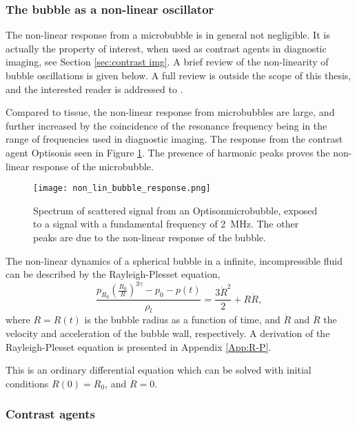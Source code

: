 \subsubsection{The bubble as a non-linear oscillator}
The non-linear response from a microbubble is in general not negligible. It is actually the property of interest, when used as contrast agents in diagnostic imaging, see Section \ref{sec:contrast img}. A brief review of the non-linearity of bubble oscillations is given below. A full review is outside the scope of this thesis, and the interested reader is addressed to \cite{Hoff2000}. 

Compared to tissue, the non-linear response from microbubbles are large, and further increased by the coincidence of the resonance frequency being in the range of frequencies used in diagnostic imaging. The response from the contrast agent Optison\texttrademark is seen in Figure \ref{Fig:bub_response}. The presence of harmonic peaks proves the non-linear response of the microbubble. 

\begin{figure}[h]
  \centering
  \label{Fig:bub_response}
  \texttt{[image: non\_lin\_bubble\_response.png]}
  \caption{Spectrum of scattered signal from an Optison\texttrademark microbubble, exposed to a signal with a fundamental frequency of \SI{2}{\mega\hertz}. The other peaks are due to the non-linear response of the bubble\cite{Shi1999}.}
\end{figure}
The non-linear dynamics of a spherical bubble in a infinite, incompressible fluid can be described by the Rayleigh-Plesset equation,
\begin{equation}
\label{r-p}
\frac{p_{R_0}\left(\frac{R_0}{R}\right)^{3\gamma}-p_0 - p(t)}{\rho_l} = \frac{3\dot{R}^2}{2}+R\ddot{R},
\end{equation}
where $R = R(t)$ is the bubble radius as a function of time, and $\dot{R}$ and $\ddot{R}$ the velocity and acceleration of the bubble wall, respectively. A derivation of the Rayleigh-Plesset equation is presented in Appendix \ref{App:R-P}.

This is an ordinary differential equation which can be solved with initial conditions $R(0) = R_0$, and $\dot{R} = 0$\cite{Moss2014}. 

\subsubsection{Contrast agents}
\label{contrast agents}

